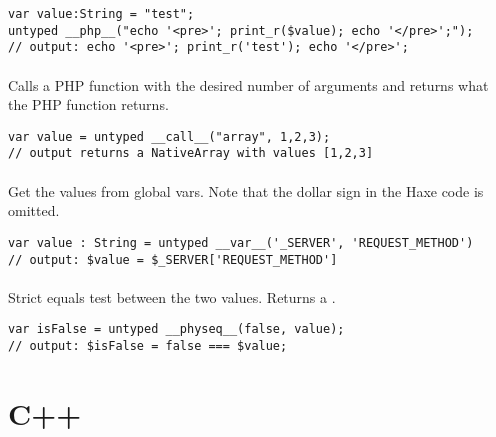 \begin{lstlisting}
var value:String = "test";
untyped __php__("echo '<pre>'; print_r($value); echo '</pre>';");
// output: echo '<pre>'; print_r('test'); echo '</pre>';
\end{lstlisting}

\paragraph{}
Calls a PHP function with the desired number of arguments and returns what the PHP function returns.

\begin{lstlisting}
var value = untyped __call__("array", 1,2,3); 
// output returns a NativeArray with values [1,2,3]
\end{lstlisting}

\paragraph{}
Get the values from global vars. Note that the dollar sign in the Haxe code is omitted.

\begin{lstlisting}
var value : String = untyped __var__('_SERVER', 'REQUEST_METHOD')  
// output: $value = $_SERVER['REQUEST_METHOD']
\end{lstlisting}

\paragraph{}
Strict equals test between the two values. Returns a .

\begin{lstlisting}
var isFalse = untyped __physeq__(false, value);
// output: $isFalse = false === $value;
\end{lstlisting}


\section{C++}
\label{target-cpp}

